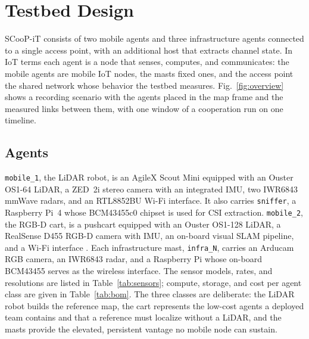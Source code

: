 \section{Testbed Design}
\label{sec:design}
SCooP-iT consists of two mobile agents and three infrastructure
agents connected to a single access point, with an additional host
that extracts channel state. In IoT terms each agent is a node that
senses, computes, and communicates: the mobile agents are mobile IoT
nodes, the masts fixed ones, and the access point the shared network
whose behavior the testbed measures. Fig.~\ref{fig:overview} shows a recording
scenario with the agents placed in the map frame and the measured
links between them, with one window of a cooperation run on one
timeline.



\subsection{Agents}
\texttt{mobile\_1}, the LiDAR robot, is an AgileX Scout Mini equipped
with an Ouster OS1-64 LiDAR, a ZED~2i stereo camera with an integrated IMU,
two IWR6843 mmWave radars, and an RTL8852BU Wi-Fi interface. It also
carries \texttt{sniffer}, a Raspberry Pi~4 whose BCM43455c0 chipset is
used for CSI extraction. \texttt{mobile\_2}, the RGB-D cart, is a
pushcart equipped with an Ouster OS1-128 LiDAR, a RealSense D455 RGB-D
camera with IMU, an on-board visual SLAM pipeline, and a Wi-Fi interface . Each infrastructure mast, \texttt{infra\_N}, carries an Arducam
RGB camera, an IWR6843 radar, and a Raspberry Pi whose on-board
BCM43455 serves as the wireless interface. The sensor models, rates,
and resolutions are listed in Table~\ref{tab:sensors}; compute,
storage, and cost per agent class are given in Table~\ref{tab:bom}.
The three classes are deliberate: the LiDAR robot builds the reference
map, the cart represents the low-cost agents a deployed team contains
and that a reference must localize without a LiDAR, and the masts
provide the elevated, persistent vantage no mobile node can sustain.







